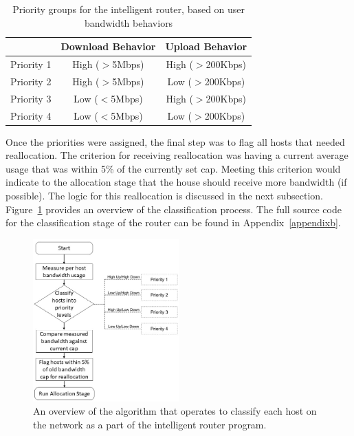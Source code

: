 \begin{table}[!ht]
\centering
\caption{Priority groups for the intelligent router, based on user bandwidth behaviors}
\begin{adjustbox}{width=0.6\textwidth, center=\textwidth}
    \begin{tabular}{r|cc}
    \multicolumn{1}{c|}{} & Download Behavior & \multicolumn{1}{l}{Upload Behavior} \\ 
    \hline
    Priority 1 & High ($>$5Mbps) & High ($>$200Kbps) \\
    Priority 2 & High ($>$5Mbps) & Low ($>$200Kbps)\\
    Priority 3 & Low ($<$5Mbps) & High ($>$200Kbps)\\
    Priority 4 & Low ($<$5Mbps) & Low ($>$200Kbps)
    \end{tabular}
\end{adjustbox}
\label{priority_table}
\end{table}
Once the priorities were assigned, the final step was to flag all hosts that needed reallocation.
The criterion for receiving reallocation was having a current average usage that was within 5\% of the currently set cap.
Meeting this criterion would indicate to the allocation stage that the house should receive more bandwidth (if possible).
The logic for this reallocation is discussed in the next subsection.
Figure~\ref{classification} provides an overview of the classification process.
The full source code for the classification stage of the router can be found in Appendix~\ref{appendixb}.
\begin{figure}[!ht]
    \centering
    \includegraphics[width=0.5\textwidth,keepaspectratio]{Images/Chpt4/Flowchart_Classification_Updated.png}
    \caption{An overview of the algorithm that operates to classify each host on the network as a part of the intelligent router program.}
    \label{classification}
\end{figure}

